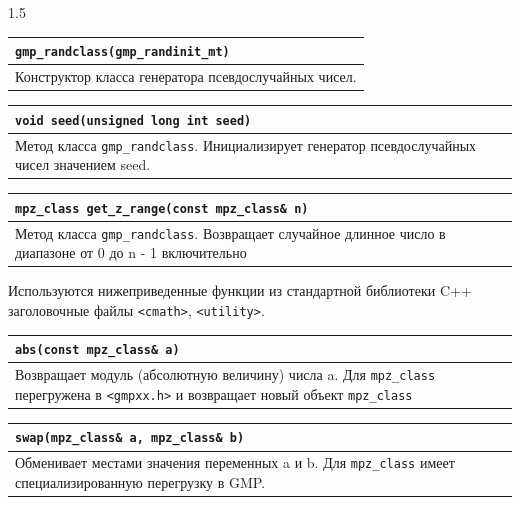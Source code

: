 \documentclass[14pt,a4paper]{extarticle}
\begin{document}
\begin{spacing}{1.5}
\vspace{0.2cm}

\noindent\begin{tabularx}{\textwidth}{|X|}
\hline
\texttt{gmp\_randclass(gmp\_randinit\_mt)} \\
\hline
Конструктор класса генератора псевдослучайных чисел. \\
\hline
\end{tabularx}

\vspace{0.2cm}

\noindent\begin{tabularx}{\textwidth}{|X|}
\hline
\texttt{void seed(unsigned long int seed)} \\
\hline
Метод класса \texttt{gmp\_randclass}. Инициализирует генератор псевдослучайных чисел значением seed. \\
\hline
\end{tabularx}

\vspace{0.2cm}

\noindent\begin{tabularx}{\textwidth}{|X|}
\hline
\texttt{mpz\_class get\_z\_range(const mpz\_class\& n)} \\
\hline
Метод класса \texttt{gmp\_randclass}. Возвращает случайное длинное число в диапазоне от 0 до n - 1 включительно \\
\hline
\end{tabularx}

\vspace{0.5cm}

\noindent Используются нижеприведенные функции из стандартной библиотеки C++ заголовочные файлы \texttt{<cmath>}, \texttt{<utility>}.

\vspace{0.2cm}

\noindent\begin{tabularx}{\textwidth}{|X|}
\hline
\texttt{abs(const mpz\_class\& a)} \\
\hline
Возвращает модуль (абсолютную величину) числа a. Для \texttt{mpz\_class} перегружена в \texttt{<gmpxx.h>} и возвращает новый объект \texttt{mpz\_class} \\
\hline
\end{tabularx}

\vspace{0.2cm}

\noindent\begin{tabularx}{\textwidth}{|X|}
\hline
\texttt{swap(mpz\_class\& a, mpz\_class\& b)} \\
\hline
Обменивает местами значения переменных a и b. Для \texttt{mpz\_class} имеет специализированную перегрузку в GMP. \\
\hline
\end{tabularx}


\end{spacing}
\end{document}
